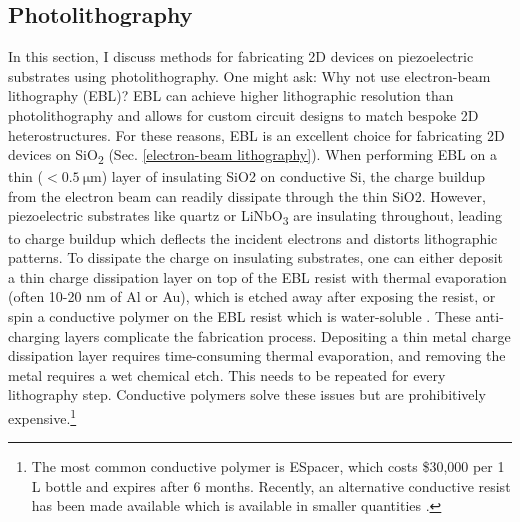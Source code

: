 \documentclass[double,12pt,1in]{beavtex}
\begin{document}
\subsection{Photolithography} \label{photolithography}

In this section, I discuss methods for fabricating 2D devices on piezoelectric substrates using photolithography. One might ask: Why not use electron-beam lithography (EBL)? EBL can achieve higher lithographic resolution than photolithography and allows for custom circuit designs to match bespoke 2D heterostructures. For these reasons, EBL is an excellent choice for fabricating 2D devices on SiO\textsubscript{2} (Sec. \ref{electron-beam lithography}). When performing EBL on a thin ($< \SI{0.5}{\micro\meter}$) layer of insulating SiO2 on conductive Si, the charge buildup from the electron beam can readily dissipate through the thin SiO2. However, piezoelectric substrates like quartz or LiNbO\textsubscript{3} are insulating throughout, leading to charge buildup which deflects the incident electrons and distorts lithographic patterns. To dissipate the charge on insulating substrates, one can either deposit a thin charge dissipation layer on top of the EBL resist with thermal evaporation (often 10-20 nm of Al or Au), which is etched away after exposing the resist, or spin a conductive polymer on the EBL resist which is water-soluble \cite{noauthor_nanolithography_nodate}. These anti-charging layers complicate the fabrication process. Depositing a thin metal charge dissipation layer requires time-consuming thermal evaporation, and removing the metal requires a wet chemical etch. This needs to be repeated for every lithography step. Conductive polymers solve these issues but are prohibitively expensive.\footnote{The most common conductive polymer is ESpacer, which costs \$30,000 per 1 L bottle and expires after 6 months. Recently, an alternative conductive resist has been made available which is available in smaller quantities \cite{lopez_charge_2019}.}  
\end{document}
